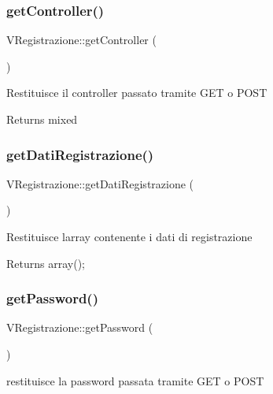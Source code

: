 \subsubsection{\texorpdfstring{get\+Controller()}{getController()}}
{\footnotesize\ttfamily V\+Registrazione\+::get\+Controller (\begin{DoxyParamCaption}{ }\end{DoxyParamCaption})}

Restituisce il controller passato tramite G\+ET o P\+O\+ST

\begin{DoxyReturn}{Returns}
mixed 
\end{DoxyReturn}
\mbox{\label{class_v_registrazione_a792e7b07cf747d79a28345750a0a3950}} 
\subsubsection{\texorpdfstring{get\+Dati\+Registrazione()}{getDatiRegistrazione()}}
{\footnotesize\ttfamily V\+Registrazione\+::get\+Dati\+Registrazione (\begin{DoxyParamCaption}{ }\end{DoxyParamCaption})}

Restituisce l\textquotesingle{}array contenente i dati di registrazione

\begin{DoxyReturn}{Returns}
array(); 
\end{DoxyReturn}
\mbox{\label{class_v_registrazione_aa9099bafae4b691c8355251bbd58799a}} 
\subsubsection{\texorpdfstring{get\+Password()}{getPassword()}}
{\footnotesize\ttfamily V\+Registrazione\+::get\+Password (\begin{DoxyParamCaption}{ }\end{DoxyParamCaption})}

restituisce la password passata tramite G\+ET o P\+O\+ST

